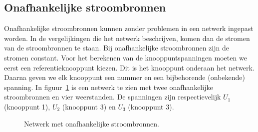 \subsection{Onafhankelijke stroombronnen}
Onafhankelijke stroombronnen kunnen zonder problemen in een netwerk ingepast worden. In de vergelijkingen die het netwerk beschrijven, komen dan de stromen van de stroombronnen te staan. Bij onafhankelijke stroombronnen zijn de stromen constant. Voor het berekenen van de knooppuntspanningen moeten we eerst een referentieknooppunt kiezen. Dit is het knooppunt onderaan het netwerk. Daarna geven we elk knooppunt een nummer en een bijbehorende (onbekende) spanning. In figuur~\ref{fig:gelnetwerkvoornodalanalysis4} is een netwerk te zien met twee onafhankelijke stroombronnen en vier weerstanden. De spanningen zijn respectievelijk $U_1$ (knooppunt 1), $U_2$ (knooppunt 3) en $U_3$ (knooppunt 3).

\begin{figure}[!ht]
\centering
{}
\caption{Netwerk met onafhankelijke stroombronnen.}
\label{fig:gelnetwerkvoornodalanalysis4}
\end{figure}


